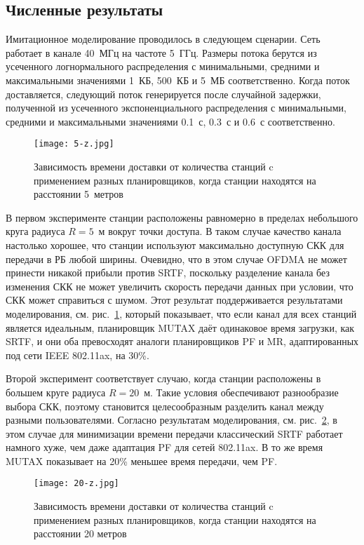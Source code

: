 \subsection{Численные результаты}

Имитационное моделирование проводилось в следующем сценарии. 
Сеть работает в канале 40~МГц на частоте 5~ГГц. 
Размеры потока берутся из усеченного логнормального распределения с минимальными, средними и максимальными значениями 1~КБ, 500~КБ и 5~МБ соответственно. 
Когда поток доставляется, следующий поток генерируется после случайной задержки, полученной из усеченного экспоненциального распределения с минимальными, средними и максимальными значениями 0.1~с, 0.3~с и 0.6~с соответственно.
\iffalse
\begin{figure}%
	\centering
	\subfloat[label 1]{{\texttt{[image: 5-z.jpg]} }}%
	\qquad
	\subfloat[label 2]{{\texttt{[image: 20-z.jpg]} }}%
	\caption{2 Figures side by side}%
	\label{fig:example}%
\end{figure}
\fi
\begin{figure}[thb]
\centering
\texttt{[image: 5-z.jpg]}
\caption{Зависимость времени доставки от количества станций c применением разных планировщиков, когда станции находятся на расстоянии 5~метров}\label{fig:10-e}
\end{figure}
В первом эксперименте станции расположены равномерно в пределах небольшого круга радиуса $R = 5$~м вокруг точки доступа. 
В таком случае качество канала настолько хорошее, что станции используют максимально доступную СКК для передачи в РБ любой ширины.
Очевидно, что в этом случае OFDMA не может принести никакой прибыли против SRTF, поскольку разделение канала без изменения СКК не может увеличить скорость передачи данных при условии, что СКК может справиться с шумом. Этот результат поддерживается результатами моделирования, см. рис.~\ref{fig:10-e}, который показывает, что если канал для всех станций является идеальным, планировщик MUTAX даёт одинаковое время загрузки, как SRTF, и они оба превосходят аналоги планировщиков PF и MR, адаптированных под сети IEEE 802.11ax, на 30\%. 

Второй эксперимент соответствует случаю, когда станции расположены в большем круге радиуса $R = 20$~м. Такие условия обеспечивают разнообразие выбора СКК, поэтому становится целесообразным разделить канал между разными пользователями.
Согласно результатам моделирования, см. рис.~\ref{fig:25-e}, в этом случае для минимизации времени передачи классический SRTF работает намного хуже, чем даже адаптация PF для сетей 802.11ax. В то же время MUTAX показывает на 20\% меньшее время передачи, чем PF. 
\begin{figure}[tbh]
	\centering
	\texttt{[image: 20-z.jpg]}
	\caption{Зависимость времени доставки от количества станций c применением разных планировщиков, когда станции находятся на расстоянии 20 метров}\label{fig:25-e}
\end{figure}

